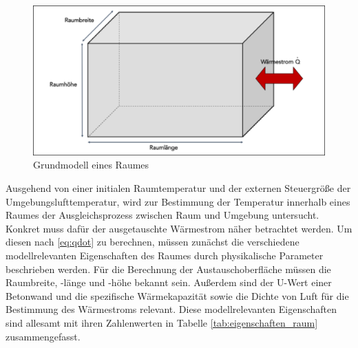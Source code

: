 \begin{figure}
\centering
\includegraphics[width=\textwidth]{abbildungen/20160316_grundraum}
\caption{Grundmodell eines Raumes}
\label{fig:grundraum}
\end{figure}

Ausgehend von einer initialen Raumtemperatur und der externen Steuergröße der Umgebungslufttemperatur, wird zur Bestimmung der Temperatur innerhalb eines Raumes der Ausgleichsprozess zwischen Raum und Umgebung untersucht. Konkret muss dafür der ausgetauschte Wärmestrom näher betrachtet werden. Um diesen nach \ref{eq:qdot} zu berechnen, müssen zunächst die verschiedene modellrelevanten Eigenschaften des Raumes durch physikalische Parameter beschrieben werden. Für die Berechnung der Austauschoberfläche müssen die Raumbreite, -länge und -höhe bekannt sein. Außerdem sind der U-Wert einer Betonwand und die spezifische Wärmekapazität sowie die Dichte von Luft für die Bestimmung des Wärmestroms relevant.
Diese modellrelevanten Eigenschaften sind allesamt mit ihren Zahlenwerten in Tabelle \ref{tab:eigenschaften_raum} zusammengefasst.

